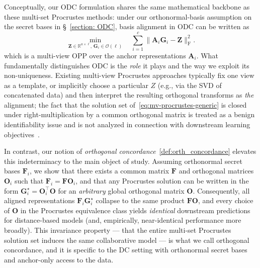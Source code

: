 \documentclass[final,3p,times]{elsarticle}
\theoremstyle{plain}
\newcommand{\matr}[1]{\bm{#1}}        %
\begin{document}
Conceptually, our ODC formulation shares the same mathematical backbone as these multi-set Procrustes methods: under our orthonormal-basis assumption on the secret bases in \S~\ref{section: ODC}, basis alignment in ODC can be written as
\begin{equation}
\min_{\matr{Z} \in \mathbb{R}^{a \times \ell},\,\matr{G}_i \in \mathcal{O}(\ell)} \quad \sum_{i=1}^{c} \|\matr{A}_i \matr{G}_i - \matr{Z}\|_\mathrm{F}^2.
\end{equation}
which is a multi-view OPP over the anchor representations $\matr{A}_i$. What fundamentally distinguishes ODC is the \emph{role} it plays and the way we exploit its non-uniqueness. Existing multi-view Procrustes approaches typically fix one view as a template, or implicitly choose a particular $Z$ (e.g., via the SVD of concatenated data) and then interpret the resulting orthogonal transforms as \emph{the} alignment; the fact that the solution set of~\eqref{eq:mv-procrustes-generic} is closed under right-multiplication by a common orthogonal matrix is treated as a benign identifiability issue and is not analyzed in connection with downstream learning objectives~\cite{Haxby2011CommonModel, Lorbert2012KernelHyperalignment, Nie2018AWP, Dong2022GrassmannProcrustes, Grave2019WassersteinProcrustes, Peng2021ProcrustesKGE}.  

In contrast, our notion of \emph{orthogonal concordance}~\ref{def:orth_concordance} elevates this indeterminacy to the main object of study. Assuming orthonormal secret bases $\matr{F}_i$, we show that there exists a common matrix $\matr{F}$ and orthogonal matrices $\matr{O}_i$ such that $\matr{F}_i = \matr{F} \matr{O}_i$, and that any Procrustes solution can be written in the form $\matr{G}_i^\star = \matr{O}_i^\top \matr{O}$ for an \emph{arbitrary} global orthogonal matrix $\matr{O}$. Consequently, all aligned representations $\matr{F}_i \matr{G}_i^\star$ collapse to the same product $\matr{F} \matr{O}$, and every choice of $\matr{O}$ in the Procrustes equivalence class yields \emph{identical} downstream predictions for distance-based models (and, empirically, near-identical performance more broadly). This invariance property — that the entire multi-set Procrustes solution set induces the same collaborative model — is what we call orthogonal concordance, and it is specific to the DC setting with orthonormal secret bases and anchor-only access to the data.  
\end{document}
